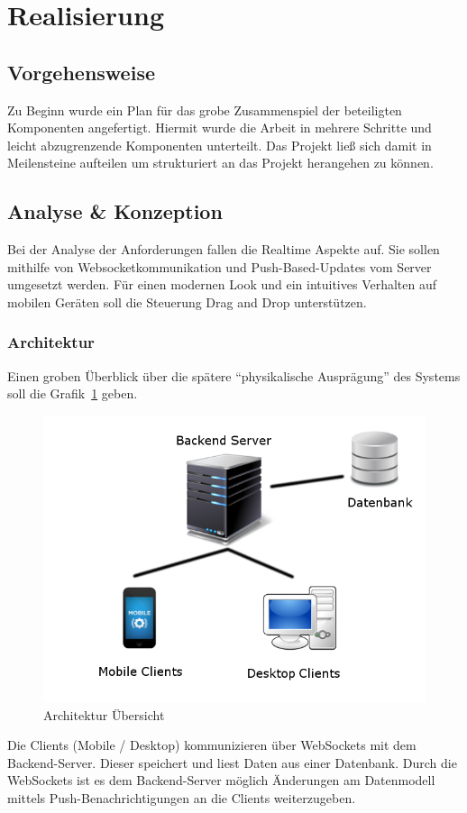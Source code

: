 \section{Realisierung}
\subsection{Vorgehensweise}
Zu Beginn wurde ein Plan für das grobe Zusammenspiel der beteiligten
Komponenten angefertigt. Hiermit wurde die Arbeit in mehrere Schritte
und leicht abzugrenzende Komponenten unterteilt. Das Projekt ließ sich
damit in Meilensteine aufteilen um strukturiert an das Projekt
herangehen zu können.
\subsection{Analyse \& Konzeption}
Bei der Analyse der Anforderungen fallen die Realtime Aspekte auf. Sie
sollen mithilfe von Websocketkommunikation und Push-Based-Updates vom
Server umgesetzt werden. Für einen modernen Look und ein intuitives
Verhalten auf mobilen Geräten soll die Steuerung Drag and Drop unterstützen.
\subsubsection{Architektur}
Einen groben Überblick über die spätere ``physikalische Ausprägung''
des Systems soll die Grafik~\ref{fig:architektur} geben.
\begin{figure}[h]
\includegraphics[scale=0.5]{img/Architektur.png}
\caption{Architektur Übersicht\label{fig:architektur}}
\end{figure}
Die Clients (Mobile / Desktop) kommunizieren über WebSockets mit dem
Backend-Server. Dieser speichert und liest Daten aus einer Datenbank.
Durch die WebSockets ist es dem Backend-Server möglich Änderungen am
Datenmodell mittels Push-Benachrichtigungen an die Clients weiterzugeben.
